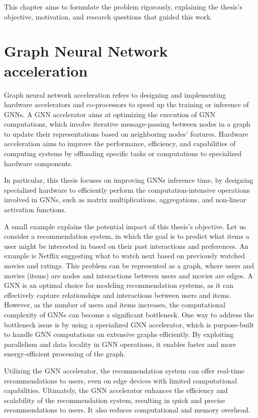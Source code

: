 This chapter aims to formulate the problem rigorously, explaining the thesis's objective, motivation, and research questions that guided this work.

\section{Graph Neural Network acceleration}
\label{sec:gnn_acceleration}%

Graph neural network acceleration refers to designing and implementing hardware accelerators and co-processors to speed up the training or inference of GNNs.
A GNN accelerator aims at optimizing the execution of GNN computations, which involve iterative message-passing between nodes in a graph to update their representations based on neighboring nodes' features.
Hardware acceleration aims to improve the performance, efficiency, and capabilities of computing systems by offloading specific tasks or computations to specialized hardware components.

In particular, this thesis focuses on improving GNNs inference time, by designing specialized hardware to efficiently perform the computation-intensive operations involved in GNNs, such as matrix multiplications, aggregations, and non-linear activation functions.

A small example explains the potential impact of this thesis's objective.
Let us consider a recommendation system, in which the goal is to predict what items a user might be interested in based on their past interactions and preferences.
An example is Netflix suggesting what to watch next based on previously watched movies and ratings.
This problem can be represented as a graph, where users and movies (items) are nodes and interactions between users and movies are edges.
A GNN is an optimal choice for modeling recommendation systems, as it can effectively capture relationships and interactions between users and items.
However, as the number of users and items increases, the computational complexity of GNNs can become a significant bottleneck.
One way to address the bottleneck issue is by using a specialized GNN accelerator, which is purpose-built to handle GNN computations on extensive graphs efficiently.
By exploiting parallelism and data locality in GNN operations, it enables faster and more energy-efficient processing of the graph.

Utilizing the GNN accelerator, the recommendation system can offer real-time recommendations to users, even on edge devices with limited computational capabilities.
Ultimately, the GNN accelerator enhances the efficiency and scalability of the recommendation system, resulting in quick and precise recommendations to users. It also reduces computational and memory overhead.


